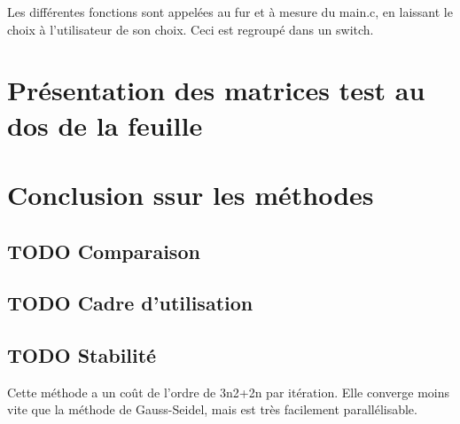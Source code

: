 \documentclass[letter]{article}
\begin{document}
Les différentes fonctions sont appelées au fur et à mesure du main.c, en laissant le choix à l'utilisateur de son choix. Ceci est regroupé dans un switch.

\section{Présentation des matrices test au dos de la feuille}
\label{sec:org7dbe37d}

\section{Conclusion ssur les méthodes}
\label{sec:orga7c4642}

\subsection{{\bfseries\sffamily TODO} Comparaison}
\label{sec:org2295b65}

\subsection{{\bfseries\sffamily TODO} Cadre d'utilisation}
\label{sec:orgdf00282}

\subsection{{\bfseries\sffamily TODO} Stabilité}
\label{sec:orgdc66548}
Cette méthode a un coût de l'ordre de 3n2+2n par itération. Elle converge moins vite que la méthode de Gauss-Seidel, mais est très facilement parallélisable. 
\end{document}
